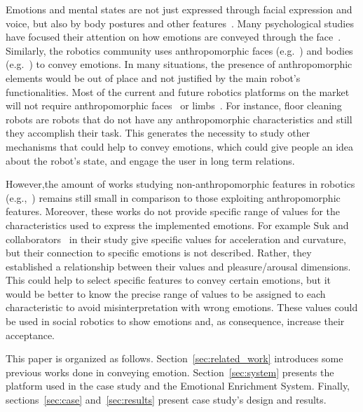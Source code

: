 Emotions and mental states are not just expressed through facial expression and voice, but also by body postures and other features~\cite{Gelder2008}. Many psychological studies have focused their attention on how emotions are conveyed through the face~\cite{kleinsmith2012affective}. Similarly, the robotics community uses anthropomorphic faces (e.g.~\cite{Breazeal2002}) and bodies (e.g.~\cite{Canamero2010}) to convey emotions.
In many situations, the presence of anthropomorphic elements would be out of place and not justified by the main robot's functionalities. Most of the current and future robotics platforms on the market will not require anthropomorphic faces~\cite{Breazeal2002} or limbs~\cite{Li2011}. For instance, floor cleaning robots are robots that do not have any anthropomorphic characteristics and still they accomplish their task.
This generates the necessity to study other mechanisms that could help to convey emotions, which could give people an idea about the robot's state, and engage the user in long term relations.

However,the amount of works studying non-anthropomorphic features in robotics (e.g.,~\cite{Saerbeck2010}) remains still small in comparison to those exploiting anthropomorphic features. Moreover, these works do not provide specific range of values for the characteristics used to express the implemented emotions. For example Suk and collaborators~\cite{NAM2014} in their study give specific values for acceleration and curvature, but their connection to specific emotions is not described. Rather, they established a relationship between their values and pleasure/arousal dimensions. This could help to select specific features to convey certain emotions, but it would be better to know the precise range of values to be assigned to each characteristic to avoid misinterpretation with wrong emotions. These values could be used in social robotics to show emotions and, as consequence, increase their acceptance.

This paper is organized as follows. Section~\ref{sec:related_work} introduces some previous works done in conveying emotion. Section~\ref{sec:system} presents the platform used in the case study and the Emotional Enrichment System. Finally, sections~\ref{sec:case} and~\ref{sec:results} present case study's design and results.
